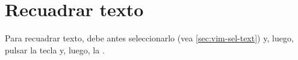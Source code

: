 \section{Recuadrar texto}\label{sec:vim-recuadrar}
Para recuadrar texto, debe antes seleccionarlo (vea \ref{sec:vim-sel-text}) y, luego, pulsar la tecla
 y, luego, la .
